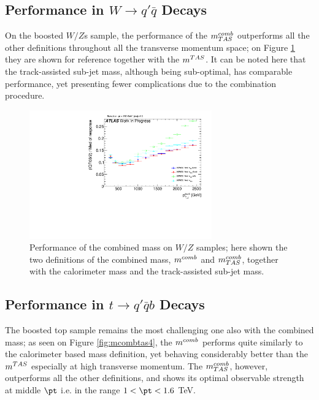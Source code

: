 \subsection{Performance in $W \to q'\bar{q}$ Decays}
On the boosted $W/Z$s sample, the performance of the $\mcombtas$ outperforms all the other definitions throughout all the transverse momentum space; on Figure \ref{fig:mcombtas3} they are shown for reference together with the $m^{TAS}$. It can be noted here that the track-assisted sub-jet mass, although being sub-optimal, has comparable performance, yet presenting fewer complications due to the combination procedure.

\begin{figure}[!ht]
  \centering
      \includegraphics[width=0.7\textwidth]{jet_part/mcomb/mcombtas3.pdf}
  \caption[$\mcombtas$ on the boosted $W/Z$]{Performance of the combined mass on $W/Z$ samples; here shown the two definitions of the combined mass, $m^{comb}$ and $\mcombtas$, together with the calorimeter mass and the track-assisted sub-jet mass.}
  \label{fig:mcombtas3}
\end{figure}


\subsection{Performance in $t\to q'\bar{q}b$ Decays}
The boosted top sample remains the most challenging one also with the combined mass; as seen on Figure \ref{fig:mcombtas4}, the $m^{comb}$ performs quite similarly to the calorimeter based mass definition, yet behaving considerably better than the $m^{TAS}$ especially at high transverse momentum. The $\mcombtas$, however, outperforms all the other definitions, and shows its optimal observable strength at middle $\pt$ i.e. in the range $1< \pt < 1.6$ TeV.

